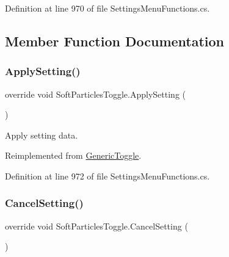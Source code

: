 Definition at line 970 of file Settings\+Menu\+Functions.\+cs.



\subsection{Member Function Documentation}
\mbox{\label{class_soft_particles_toggle_a19138a1f7285d6d416ef7b62a3176e9e}} 
\subsubsection{\texorpdfstring{Apply\+Setting()}{ApplySetting()}}
{\footnotesize\ttfamily override void Soft\+Particles\+Toggle.\+Apply\+Setting (\begin{DoxyParamCaption}{ }\end{DoxyParamCaption})\hspace{0.3cm}{\ttfamily [virtual]}}



Apply setting data. 



Reimplemented from \hyperlink{class_generic_toggle_af184e77b892617775fd0785fad7e750a}{Generic\+Toggle}.



Definition at line 972 of file Settings\+Menu\+Functions.\+cs.

\mbox{\label{class_soft_particles_toggle_a60520a7db08f28059e7407110749c2f6}} 
\subsubsection{\texorpdfstring{Cancel\+Setting()}{CancelSetting()}}
{\footnotesize\ttfamily override void Soft\+Particles\+Toggle.\+Cancel\+Setting (\begin{DoxyParamCaption}{ }\end{DoxyParamCaption})\hspace{0.3cm}{\ttfamily [virtual]}}



